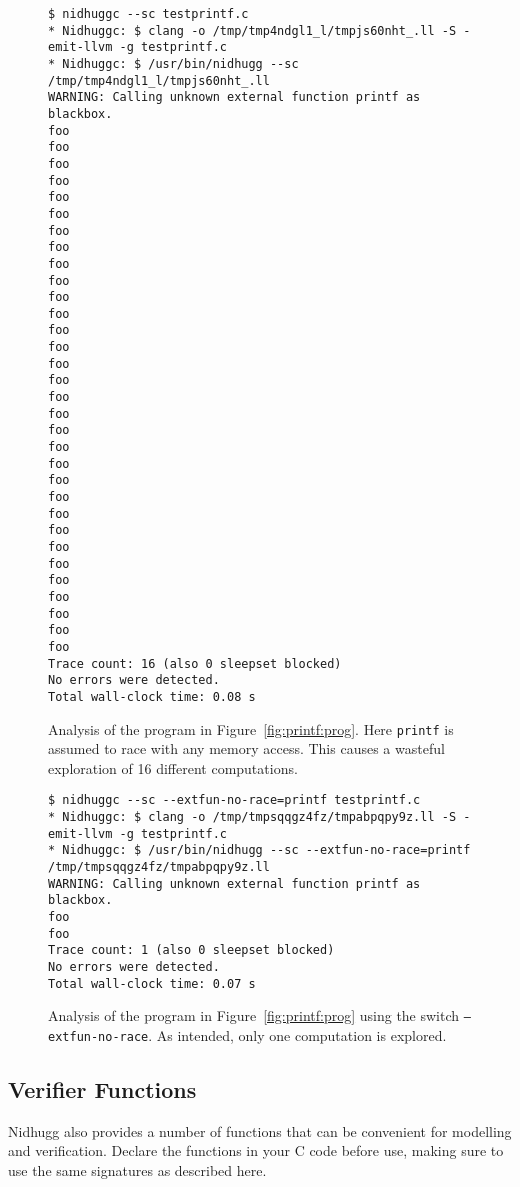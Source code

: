 \documentclass[a4paper]{article}
\begin{document}
\begin{figure}
  \scriptsize{
\begin{verbatim}
$ nidhuggc --sc testprintf.c
* Nidhuggc: $ clang -o /tmp/tmp4ndgl1_l/tmpjs60nht_.ll -S -emit-llvm -g testprintf.c
* Nidhuggc: $ /usr/bin/nidhugg --sc /tmp/tmp4ndgl1_l/tmpjs60nht_.ll
WARNING: Calling unknown external function printf as blackbox.
foo
foo
foo
foo
foo
foo
foo
foo
foo
foo
foo
foo
foo
foo
foo
foo
foo
foo
foo
foo
foo
foo
foo
foo
foo
foo
foo
foo
foo
foo
foo
foo
Trace count: 16 (also 0 sleepset blocked)
No errors were detected.
Total wall-clock time: 0.08 s
\end{verbatim}}
\caption{Analysis of the program in Figure~\ref{fig:printf:prog}. Here
  \texttt{printf} is assumed to race with any memory access. This
  causes a wasteful exploration of 16 different
  computations.}\label{fig:printf:run:16}
\end{figure}

\begin{figure}
  \scriptsize{
\begin{verbatim}
$ nidhuggc --sc --extfun-no-race=printf testprintf.c
* Nidhuggc: $ clang -o /tmp/tmpsqqgz4fz/tmpabpqpy9z.ll -S -emit-llvm -g testprintf.c
* Nidhuggc: $ /usr/bin/nidhugg --sc --extfun-no-race=printf /tmp/tmpsqqgz4fz/tmpabpqpy9z.ll
WARNING: Calling unknown external function printf as blackbox.
foo
foo
Trace count: 1 (also 0 sleepset blocked)
No errors were detected.
Total wall-clock time: 0.07 s
\end{verbatim}}
\caption{Analysis of the program in Figure~\ref{fig:printf:prog} using
  the switch \texttt{--extfun-no-race}. As intended, only one
  computation is explored.}\label{fig:printf:run:1}
\end{figure}


\subsection{Verifier Functions}

Nidhugg also provides a number of functions that can be convenient for
modelling and verification. Declare the functions in your C code
before use, making sure to use the same signatures as described here.
\end{document}

